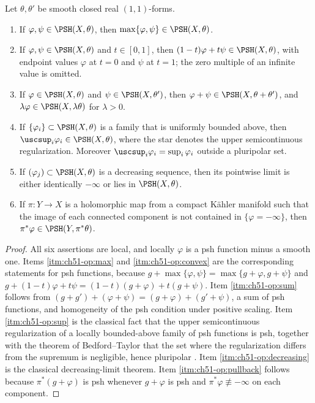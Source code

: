 \begin{proposition}\label{prop:ch51-psh-operations}
Let $\theta,\theta'$ be smooth closed real $(1,1)$-forms.
\begin{enumerate}
\item\label{itm:ch51-op:max}
      If $\varphi,\psi\in\PSH(X,\theta)$, then
      $\max\{\varphi,\psi\}\in\PSH(X,\theta)$.
\item\label{itm:ch51-op:convex}
      If $\varphi,\psi\in\PSH(X,\theta)$ and $t\in[0,1]$, then
      $(1-t)\varphi+t\psi\in\PSH(X,\theta)$, with endpoint values
      $\varphi$ at $t=0$ and $\psi$ at $t=1$; the zero multiple of an
      infinite value is omitted.
\item\label{itm:ch51-op:sum}
      If $\varphi\in\PSH(X,\theta)$ and $\psi\in\PSH(X,\theta')$,
      then $\varphi+\psi\in\PSH(X,\theta+\theta')$, and
      $\lambda\varphi\in\PSH(X,\lambda\theta)$ for $\lambda>0$.
\item\label{itm:ch51-op:sup}
      If $\{\varphi_i\}\subset\PSH(X,\theta)$ is a family that is
      uniformly bounded above, then
      $\uscsup_i\varphi_i\in\PSH(X,\theta)$, where the star denotes the
      upper semicontinuous regularization.  Moreover
      $\uscsup_i\varphi_i=\sup_i\varphi_i$ outside a pluripolar set.
\item\label{itm:ch51-op:decreasing}
      If $(\varphi_j)\subset\PSH(X,\theta)$ is a decreasing sequence,
      then its pointwise limit is either identically $-\infty$ or lies
      in $\PSH(X,\theta)$.
\item\label{itm:ch51-op:pullback}
      If $\pi:Y\to X$ is a holomorphic map from a compact K\"ahler
      manifold such that the image of each connected component is not
      contained in $\{\varphi=-\infty\}$,
      then $\pi^*\varphi\in\PSH(Y,\pi^*\theta)$.
\end{enumerate}
\end{proposition}

\begin{proof}
All six assertions are local, and locally $\varphi$ is a psh function
minus a smooth one.  Items \cref{itm:ch51-op:max} and
\cref{itm:ch51-op:convex} are the corresponding statements for psh
functions, because $g+\max\{\varphi,\psi\}=\max\{g+\varphi,g+\psi\}$ and
$g+(1-t)\varphi+t\psi=(1-t)(g+\varphi)+t(g+\psi)$.
Item \cref{itm:ch51-op:sum} follows from
$(g+g')+(\varphi+\psi)=(g+\varphi)+(g'+\psi)$, a sum of psh functions,
and homogeneity of the psh condition under positive scaling.
Item \cref{itm:ch51-op:sup} is the classical fact that the upper
semicontinuous regularization of a locally bounded-above family of psh
functions is psh, together with the theorem of Bedford--Taylor that the
set where the regularization differs from the supremum is negligible,
hence pluripolar \cite[Theorem~7.1]{BT82}.
Item \cref{itm:ch51-op:decreasing} is the classical decreasing-limit
theorem.  Item \cref{itm:ch51-op:pullback} follows because
$\pi^*(g+\varphi)$ is psh whenever $g+\varphi$ is psh and
$\pi^*\varphi\not\equiv-\infty$ on each component.
\end{proof}

